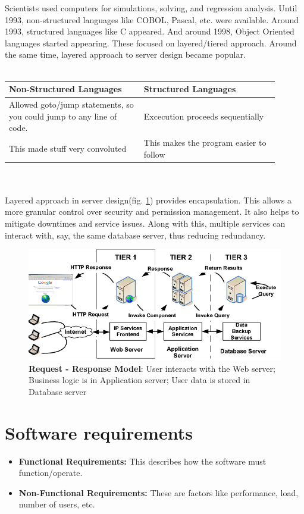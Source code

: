 \documentclass[10pt, a4paper]{report}
\begin{document}
			Scientists used computers for simulations, solving, and regression analysis. Until 1993, non-structured languages like COBOL, Pascal, etc. were available. Around 1993, structured languages like C appeared. And around 1998, Object Oriented languages started appearing. These focused on layered/tiered approach. Around the same time, layered approach to server design became popular.
			\\ \\
			\begin{tabular}{|p{0.45\linewidth} | p{0.45\linewidth}|}
				\hline
				Non-Structured Languages & Structured Languages \\
				\hline
				Allowed goto/jump statements, so you could jump to any line of code. & Excecution proceeds sequentially \\
				\hline
				This made stuff very convoluted & This makes the program easier to follow \\
				\hline
			\end{tabular}
			\\ \\
			Layered approach in server design(fig. \ref{fig:request-response-model}) provides encapsulation. This allows a more granular control over security and permission management. It also helps to mitigate downtimes and service issues. Along with this, multiple services can interact with, say, the same database server, thus reducing redundancy.
			\begin{figure}
				\centering
				\includegraphics[width=0.7\linewidth]{img/request-response-model}
				\caption[Request - Response Model]{\textbf{Request - Response Model}: User interacts with the Web server; Business logic is in Application server; User data is stored in Database server}
				\label{fig:request-response-model}
			\end{figure}
		\section{Software requirements}
			\begin{itemize}
				\item \textbf{Functional Requirements:} This describes how the software must function/operate.
				\item \textbf{Non-Functional Requirements:} These are factors like performance, load, number of users, etc.
			\end{itemize}
\end{document}
